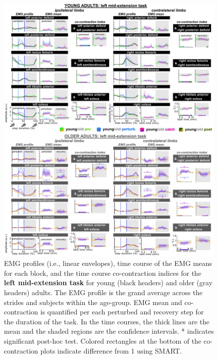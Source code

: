 \documentclass[../thesis_seyed.tex]{subfiles}
\begin{document}
\begin{figure}[H]
    \centering
    \includegraphics[scale=.8]{../img/04_LME-EMG-CoCont.jpg}
    \caption{EMG profiles (i.e., linear envelopes), time course of the EMG means for each block, and the time course co-contraction indices for the \textbf{left mid-extension task} for young (black headers) and older (gray headers) adults. The EMG profile is the grand average across the strides and subjects within the age-group. EMG mean and co-contraction is quantified per each perturbed and recovery step for the duration of the task.  In the time courses, the thick lines are the mean and the shaded regions are the confidence intervals. * indicates significant post-hoc test. Colored rectangles at the bottom of the co-contraction plots indicate difference from 1 using SMART.}
    \label{fig:LMEEMG}
\end{figure}
\end{document}
